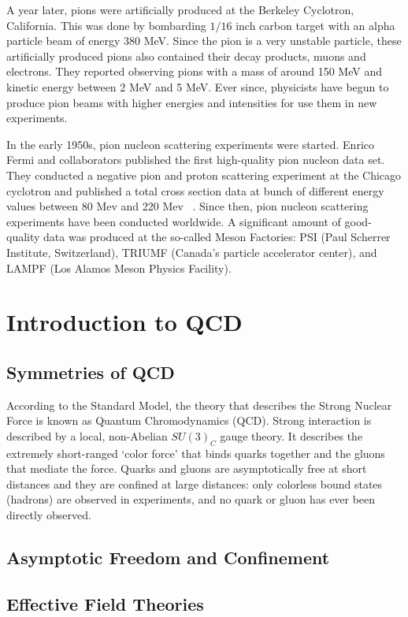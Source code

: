 A year later, pions were artificially produced at the Berkeley Cyclotron, California\cite{FirstPionsBerkeley}. This was done by bombarding $1/16$ inch carbon target with an alpha particle beam of energy 380 MeV. Since the pion is a very unstable particle, these artificially produced pions also contained their decay products, muons and electrons. They reported observing pions with a mass of around 150 MeV and kinetic energy between 2 MeV and 5 MeV. Ever since, physicists have begun to produce pion beams with higher energies and intensities for use them in new experiments.


In the early 1950s, pion nucleon scattering experiments were started. Enrico Fermi and collaborators published the first high-quality pion nucleon data set. They conducted a negative pion and proton scattering experiment at the Chicago cyclotron and published a total cross section data at bunch of different energy values between 80 Mev and 220 Mev  \cite{PiNScatteringFermi1952}. Since then, pion nucleon scattering experiments have been conducted worldwide. A significant amount of good-quality data was produced at the so-called Meson Factories: PSI (Paul Scherrer Institute, Switzerland), TRIUMF (Canada's particle accelerator center), and LAMPF (Los Alamos Meson Physics Facility).


\section{Introduction to QCD}

\subsection{Symmetries of QCD}


According to the Standard Model, the theory that describes the Strong Nuclear Force is known as Quantum Chromodynamics (QCD). Strong interaction is described by a local, non-Abelian $SU(3)_C$ gauge theory. It describes the extremely short-ranged ‘color force’ that binds quarks together and the gluons that mediate the force. Quarks and gluons are asymptotically free at short distances and they are confined at large distances: only colorless bound states (hadrons) are observed in experiments, and no quark or gluon has ever been directly observed.

\subsection{Asymptotic Freedom and Confinement}

\subsection{Effective Field Theories}
